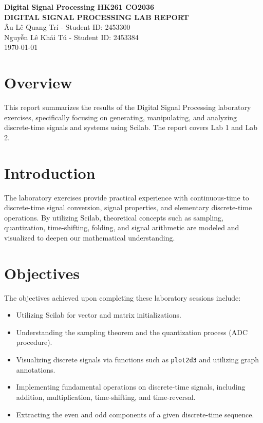 \documentclass[12pt,a4paper]{article}
\begin{document}
\begin{center}
    \textbf{Digital Signal Processing \hfill HK261 \hfill CO2036}\\[2cm]
    
    \huge\textbf{DIGITAL SIGNAL PROCESSING LAB REPORT}\\[1cm]
    
    \large Âu Lê Quang Trí - Student ID: 2453300\\[0.5cm]
    \large Nguyễn Lê Khải Tú - Student ID: 2453384\\[1cm]
    
    \large \today\\[2cm]
\end{center}

\section*{Overview}
This report summarizes the results of the Digital Signal Processing laboratory exercises, specifically focusing on generating, manipulating, and analyzing discrete-time signals and systems using Scilab. The report covers Lab 1 and Lab 2.

\section{Introduction}
The laboratory exercises provide practical experience with continuous-time to discrete-time signal conversion, signal properties, and elementary discrete-time operations. By utilizing Scilab, theoretical concepts such as sampling, quantization, time-shifting, folding, and signal arithmetic are modeled and visualized to deepen our mathematical understanding.

\section{Objectives}
The objectives achieved upon completing these laboratory sessions include:
\begin{itemize}
    \item Utilizing Scilab for vector and matrix initializations.
    \item Understanding the sampling theorem and the quantization process (ADC procedure).
    \item Visualizing discrete signals via functions such as \texttt{plot2d3} and utilizing graph annotations.
    \item Implementing fundamental operations on discrete-time signals, including addition, multiplication, time-shifting, and time-reversal.
    \item Extracting the even and odd components of a given discrete-time sequence.
\end{itemize}
\end{document}
